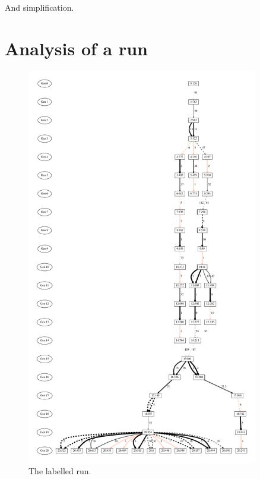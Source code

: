 And simplification.


\section{Analysis of a run}

\begin{figure}[tb!p] %
	\begin{center}
		\includegraphics[width=0.9\textwidth]{../figures/run0_filtered_BandW}
	\end{center}
	\caption{The labelled run.}
	\label{fig:run0Labelled}       %
\end{figure}

